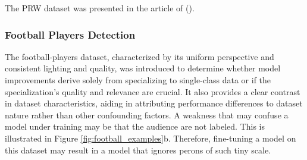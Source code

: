 The PRW dataset was presented in the article of \citeauthor{zheng2017person} (\citeyear{zheng2017person}).

\subsubsection{Football Players Detection}
The football-players dataset, characterized by its uniform perspective and consistent lighting and quality, was introduced to determine whether model improvements derive solely from specializing to single-class data or if the specialization's quality and relevance are crucial. It also provides a clear contrast in dataset characteristics, aiding in attributing performance differences to dataset nature rather than other confounding factors. A weakness that may confuse a model under training may be that the audience are not labeled. This is illustrated in Figure \ref{fig:football_examples}b. Therefore, fine-tuning a model on this dataset may result in a model that ignores perons of such tiny scale. 

